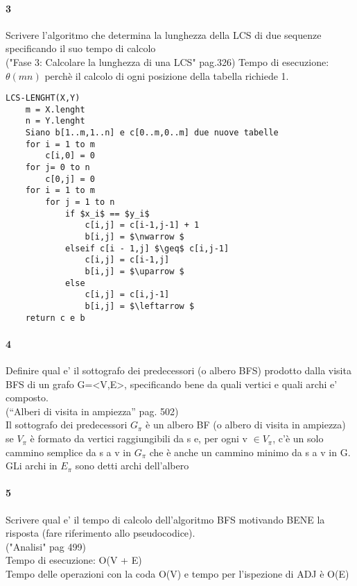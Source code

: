 \documentclass[12pt, a4paper, openany]{book}
\begin{document}
    \paragraph{3}
    Scrivere l’algoritmo che determina la lunghezza della LCS di due sequenze
    specificando il suo tempo di calcolo\\
    ("Fase 3: Calcolare la lunghezza di una LCS" pag.326)
    Tempo di esecuzione: $\theta(mn)$ perchè il calcolo di ogni posizione della tabella richiede 1.

    \begin{lstlisting}[mathescape=true]
LCS-LENGHT(X,Y)
    m = X.lenght
    n = Y.lenght
    Siano b[1..m,1..n] e c[0..m,0..m] due nuove tabelle
    for i = 1 to m
        c[i,0] = 0
    for j= 0 to n
        c[0,j] = 0
    for i = 1 to m
        for j = 1 to n
            if $x_i$ == $y_i$
                c[i,j] = c[i-1,j-1] + 1  
                b[i,j] = $\nwarrow $
            elseif c[i - 1,j] $\geq$ c[i,j-1]
                c[i,j] = c[i-1,j]  
                b[i,j] = $\uparrow $
            else
                c[i,j] = c[i,j-1]  
                b[i,j] = $\leftarrow $
    return c e b
\end{lstlisting}
    \paragraph{4}
    Definire qual e’ il sottografo dei predecessori (o albero BFS) prodotto dalla
    visita BFS di un grafo G=<V,E>, specificando bene da quali vertici e quali
    archi e’ composto.\\
    (“Alberi di visita in ampiezza”  pag. 502)\\
    Il sottografo dei predecessori $G_\pi$ è un albero BF (o albero di visita in ampiezza) se $V_\pi$ è formato da vertici raggiungibili da s e, per ogni v $\in V_\pi$, c'è un solo cammino semplice da s a v in $G_\pi$ che è anche un cammino minimo da s a v in G. GLi archi in $E_\pi$ sono detti archi dell'albero
    \paragraph{5}
    Scrivere qual e’ il tempo di calcolo dell’algoritmo BFS motivando BENE la
    risposta (fare riferimento allo pseudocodice).\\
    ("Analisi" pag 499)\\
    Tempo di esecuzione: O(V + E)\\
    Tempo delle operazioni con la coda O(V) e tempo per l'ispezione di ADJ è O(E)
\end{document}
